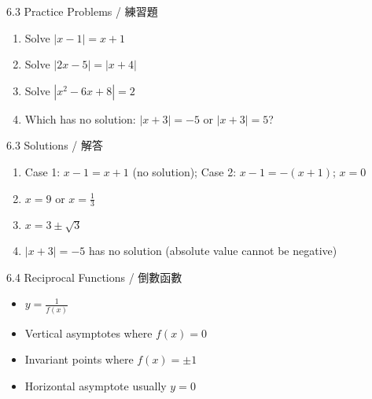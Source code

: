 \documentclass[aspectratio=169]{beamer}
\begin{document}
\begin{frame}{6.3 Practice Problems / 練習題}
    \begin{tcolorbox}[colback=lightgray,colframe=accent,title=Practice]
        \footnotesize
        \begin{enumerate}
            \item Solve $|x-1| = x+1$
            \item Solve $|2x-5| = |x+4|$
            \item Solve $|x^2-6x+8| = 2$
            \item Which has no solution: $|x+3| = -5$ or $|x+3| = 5$?
        \end{enumerate}
    \end{tcolorbox}
\end{frame}

\begin{frame}{6.3 Solutions / 解答}
    \begin{tcolorbox}[colback=lightgray,colframe=accent,title=Solutions]
        \footnotesize
        \begin{enumerate}
            \item Case 1: $x-1 = x+1$ (no solution); Case 2: $x-1 = -(x+1)$; $x = 0$
            \item $x = 9$ or $x = \frac{1}{3}$
            \item $x = 3 \pm \sqrt{3}$
            \item $|x+3| = -5$ has no solution (absolute value cannot be negative)
        \end{enumerate}
    \end{tcolorbox}
\end{frame}

\begin{frame}{6.4 Reciprocal Functions / 倒數函數}
    \begin{tcolorbox}[colback=lightgray,colframe=primary,title=Key Points]
        \footnotesize
        \begin{itemize}
            \item $y = \frac{1}{f(x)}$
            \item Vertical asymptotes where $f(x) = 0$
            \item Invariant points where $f(x) = \pm 1$
            \item Horizontal asymptote usually $y = 0$
        \end{itemize}
    \end{tcolorbox}
    \vspace{0.5em}
    \begin{center}
    \end{center}
\end{frame}
\end{document}
